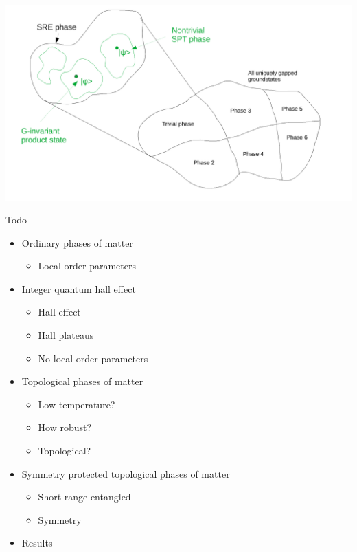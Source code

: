 \documentclass{beamer}
\begin{document}
\begin{frame}
	\begin{center}
		\includegraphics[width=\textwidth]{Images/SPT_Phases.pdf}
	\end{center}
\end{frame}

\begin{frame}{Todo}
	\begin{itemize}
		\item[\done] Ordinary phases of matter
		\begin{itemize}
			\item[\done] Local order parameters
		\end{itemize}
		\item[\done] Integer quantum hall effect
		\begin{itemize}
			\item[\done] Hall effect
			\item[\done] Hall plateaus
			\item[\done] No local order parameters
		\end{itemize}
		\item[\done] Topological phases of matter
		\begin{itemize}
			\item[\done] Low temperature?
			\item[\done] How robust?
			\item[\done] Topological?
		\end{itemize}
		\item[\done] Symmetry protected topological phases of matter
		\begin{itemize}
			\item[\done] Short range entangled
			\item[\done] Symmetry
		\end{itemize}
		\item[\todo] Results
	\end{itemize}
\end{frame}
\end{document}

